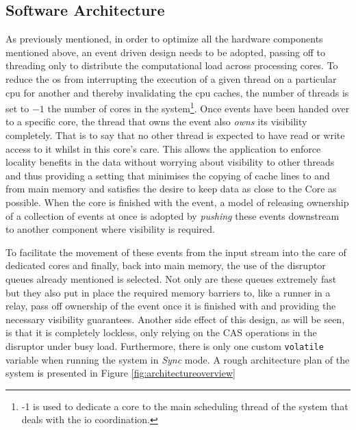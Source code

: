 \documentclass[a4paper,11pt]{scrreprt}
\begin{document}
\subsection{Software Architecture}
As previously mentioned, in order to optimize all the hardware components mentioned above, an event driven design needs to be adopted, passing off to threading only to distribute the computational load across processing cores. To reduce the \acrshort{os} from interrupting the execution of a given thread on a particular \acrshort{cpu} for another and thereby invalidating the \acrshort{cpu} caches, the number of threads is set to \(-1\) the number of cores in the system\footnote{-1 is used to dedicate a core to the main scheduling thread of the system that deals with the \acrshort{io} coordination.}. Once events have been handed over to a specific core, the thread that owns the event also \textit{owns} its visibility completely. That is to say that no other thread is expected to have read or write access to it whilst in this core's care. This allows the application to enforce locality benefits in the data without worrying about visibility to other threads and thus providing a setting that minimises the copying of cache lines to and from main memory and satisfies the desire to keep data as close to the Core as possible. When the core is finished with the event, a model of releasing ownership of a collection of events at once is adopted by \textit{pushing} these events downstream to another component where visibility is required. 

To facilitate the movement of these events from the input stream into the care of dedicated cores and finally, back into main memory, the use of the disruptor queues already mentioned is selected. Not only are these queues extremely fast but they also put in place the required memory barriers to, like a runner in a relay, pass off ownership of the event once it is finished with and providing the necessary visibility guarantees. Another side effect of this design, as will be seen, is that it is completely lockless, only relying on the CAS operations in the disruptor under busy load. Furthermore, there is only one custom \texttt{volatile} variable when running the system in \textit{Sync} mode. A rough architecture plan of the system is presented in Figure \ref{fig:architectureoverview}
\end{document}
